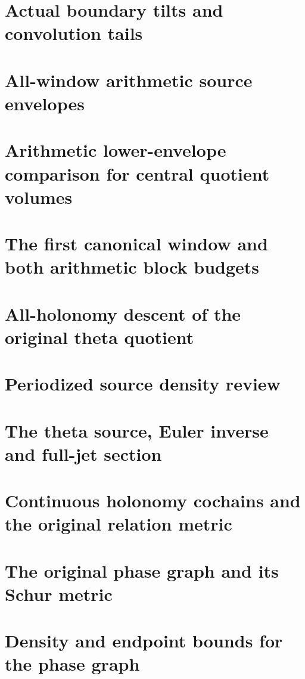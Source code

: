 \documentclass[11pt,a4paper,oneside,openany]{book}
\theoremstyle{definition}
\begin{document}
\chapter{Actual boundary tilts and convolution tails}
\begingroup

\endgroup
\chapter{All-window arithmetic source envelopes}
\begingroup

\endgroup
\chapter{Arithmetic lower-envelope comparison for central quotient volumes}
\begingroup

\endgroup
\chapter{The first canonical window and both arithmetic block budgets}
\begingroup

\endgroup
\chapter{All-holonomy descent of the original theta quotient}
\begingroup

\endgroup
\chapter{Periodized source density review}
\begingroup

\endgroup
\chapter{The theta source, Euler inverse and full-jet section}
\begingroup

\endgroup
\chapter{Continuous holonomy cochains and the original relation metric}
\begingroup

\endgroup
\chapter{The original phase graph and its Schur metric}
\begingroup

\endgroup
\chapter{Density and endpoint bounds for the phase graph}
\begingroup

\endgroup
\end{document}
